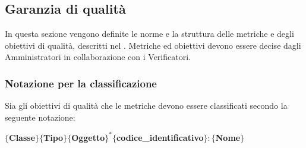 \subsection{Garanzia di qualità} \label{garanzia di qualita}

    In questa sezione vengono definite le norme e la struttura delle metriche e degli obiettivi di qualità, descritti
    nel \vPianoDiQualifica{}. Metriche ed obiettivi devono essere decise dagli Amministratori in collaborazione con i Verificatori.

    \subsubsection{Notazione per la classificazione}

        Sia gli obiettivi di qualità che le metriche devono essere classificati secondo la seguente notazione:

            \begin{center}
                \textbf{$\{$Classe$\}\{$Tipo$\}\{$Oggetto$\}^*\{$codice\_identificativo$\} : \{$Nome$\}$}
            \end{center}

